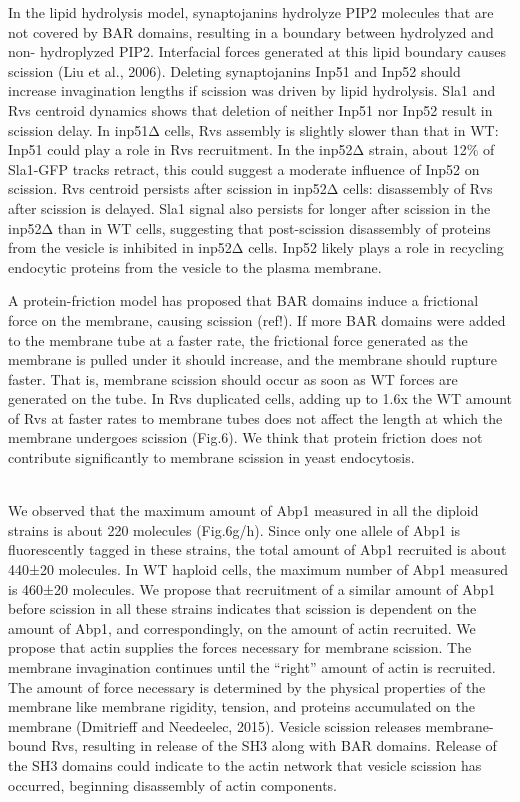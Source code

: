 \documentclass[9pt,lineno]{elife}
\begin{document}
In the lipid hydrolysis model, synaptojanins hydrolyze PIP2 molecules that are not covered by BAR domains, resulting in a boundary between hydrolyzed and non- hydroplyzed PIP2. Interfacial forces generated at this lipid boundary causes scission (Liu et al., 2006). Deleting  synaptojanins Inp51 and Inp52 should increase invagination lengths if scission was driven by lipid hydrolysis. Sla1 and Rvs centroid dynamics shows that deletion of neither Inp51 nor Inp52 result in scission delay. In inp51Δ cells, Rvs assembly is slightly slower than that in WT: Inp51 could play a role in Rvs recruitment. In the inp52Δ strain, about 12\% of Sla1-GFP tracks retract, this could suggest a moderate influence of Inp52 on scission. Rvs centroid persists after scission in inp52Δ cells: disassembly of Rvs after scission is delayed. Sla1 signal also persists for longer after scission in the inp52Δ than in WT cells, suggesting that post-scission disassembly of proteins from the vesicle is inhibited in inp52Δ cells. Inp52 likely plays a role in recycling endocytic proteins from the vesicle to the plasma membrane. 

A protein-friction model has proposed that BAR domains induce a frictional force on the membrane, causing scission (ref!). If more BAR domains were added to the membrane tube at a faster rate, the frictional  force generated as the membrane is pulled under it should increase, and the membrane should rupture faster. That is, membrane scission should occur as soon as WT forces are generated on the tube. In Rvs duplicated cells, adding up to 1.6x the WT amount of Rvs at faster rates to membrane tubes does not affect the length at which the membrane undergoes scission (Fig.6). We think that protein friction does not contribute significantly to membrane scission in yeast endocytosis. 

~\\
We  observed that the maximum amount of Abp1 measured in all the diploid strains is about 220 molecules (Fig.6g/h). Since only one allele of Abp1 is fluorescently tagged in these strains, the total amount of Abp1 recruited is  about 440±20 molecules. In WT haploid cells, the maximum number of Abp1 measured is 460±20 molecules. We propose that recruitment of a similar amount of Abp1 before scission in all these strains indicates that scission is dependent on the amount of Abp1, and correspondingly, on the amount of actin recruited. We propose that actin supplies the forces necessary for membrane scission. The membrane invagination continues until the “right” amount of actin is recruited. The amount of force necessary is determined by the physical properties of the membrane like membrane rigidity, tension, and proteins accumulated on the membrane (Dmitrieff and Needeelec, 2015). Vesicle scission releases membrane-bound Rvs, resulting in release of the SH3 along with BAR domains. Release of the SH3 domains could indicate to the actin network that vesicle scission has occurred, beginning disassembly of actin components. 
\end{document}
